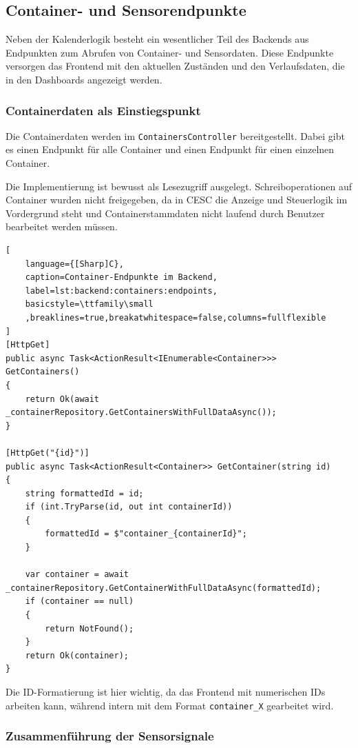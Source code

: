 \subsection{Container- und Sensorendpunkte}

Neben der Kalenderlogik besteht ein wesentlicher Teil des Backends aus Endpunkten zum Abrufen von Container- und Sensordaten. Diese Endpunkte versorgen das Frontend mit den aktuellen Zuständen und den Verlaufsdaten, die in den Dashboards angezeigt werden.

\subsubsection{Containerdaten als Einstiegspunkt}

Die Containerdaten werden im \texttt{ContainersController} bereitgestellt. Dabei gibt es einen Endpunkt für alle Container und einen Endpunkt für einen einzelnen Container.

Die Implementierung ist bewusst als Lesezugriff ausgelegt. Schreiboperationen auf Container wurden nicht freigegeben, da in CESC die Anzeige und Steuerlogik im Vordergrund steht und Containerstammdaten nicht laufend durch Benutzer bearbeitet werden müssen.

\begin{lstlisting}[
    language={[Sharp]C},
    caption=Container-Endpunkte im Backend,
    label=lst:backend:containers:endpoints,
    basicstyle=\ttfamily\small
    ,breaklines=true,breakatwhitespace=false,columns=fullflexible
]
[HttpGet]
public async Task<ActionResult<IEnumerable<Container>>> GetContainers()
{
    return Ok(await _containerRepository.GetContainersWithFullDataAsync());
}

[HttpGet("{id}")]
public async Task<ActionResult<Container>> GetContainer(string id)
{
    string formattedId = id;
    if (int.TryParse(id, out int containerId))
    {
        formattedId = $"container_{containerId}";
    }

    var container = await _containerRepository.GetContainerWithFullDataAsync(formattedId);
    if (container == null)
    {
        return NotFound();
    }
    return Ok(container);
}
\end{lstlisting}

Die ID-Formatierung ist hier wichtig, da das Frontend mit numerischen IDs arbeiten kann, während intern mit dem Format \texttt{container\_X} gearbeitet wird.

\subsubsection{Zusammenführung der Sensorsignale}

